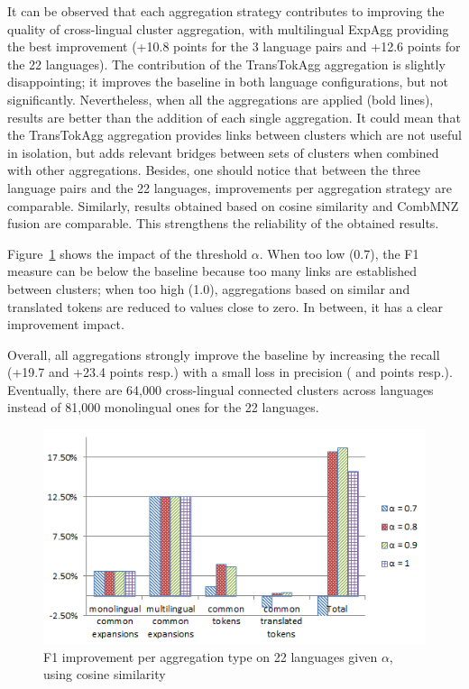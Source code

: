 \documentclass[output=paper]{langsci/langscibook}
\begin{document}
It can be observed that each aggregation strategy contributes to
improving the quality of cross-lingual cluster aggregation, with
multilingual ExpAgg providing the best improvement (+10.8 points for
the 3 language pairs and +12.6 points for the 22 languages). The
contribution of the TransTokAgg aggregation is slightly
disappointing; it improves the baseline in both language
configurations, but not significantly.  Nevertheless, when all the
aggregations are applied (bold lines), results are better than the
addition of each single aggregation. It could mean that the
TransTokAgg aggregation provides links between clusters which are
not useful in isolation, but adds relevant bridges between sets of
clusters when combined with other aggregations. Besides, one should
notice that between the three language pairs and the 22 languages,
improvements per aggregation strategy are comparable. Similarly,
results obtained based on cosine similarity and CombMNZ fusion are
comparable.  This strengthens the reliability of the obtained results.

Figure~\ref{jac:fig:Eval22l} shows the impact of the threshold
$\alpha$. When too low (0.7), the F1 measure can be below the baseline
because too many links are established between clusters; when too high
(1.0), aggregations based on similar and translated tokens are reduced
to values close to zero.  In between, it has a clear improvement
impact.

Overall, all aggregations strongly improve the baseline by increasing
the recall (+19.7 and +23.4 points resp.) with a small loss in
precision ( and  points resp.). Eventually, there are 64,000
cross-lingual connected clusters across languages instead of 81,000
monolingual ones for the 22 languages.

\begin{figure}
\includegraphics[scale=0.6]{figures/cosine_average_all_ln_improvment1}
\caption{F1 improvement per aggregation type on 22 languages given $\alpha$, using cosine similarity}
\label{jac:fig:Eval22l}
\end{figure}
\end{document}
